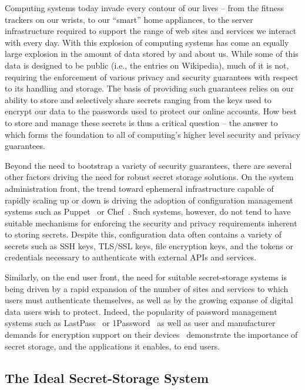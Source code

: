 Computing systems today invade every contour of our lives -- from the
fitness trackers on our wrists, to our ``smart'' home appliances, to
the server infrastructure required to support the range of web sites
and services we interact with every day. With this explosion of
computing systems has come an equally large explosion in the amount of
data stored by and about us. While some of this data is designed to be
public (i.e., the entries on Wikipedia), much of it is not, requiring
the enforcement of various privacy and security guarantees with
respect to its handling and storage. The basis of providing such
guarantees relies on our ability to store and selectively share
secrets ranging from the keys used to encrypt our data to the
passwords used to protect our online accounts. How best to store and
manage these secrets is thus a critical question -- the answer to
which forms the foundation to all of computing's higher level security
and privacy guarantees.

Beyond the need to bootstrap a variety of security guarantees, there
are several other factors driving the need for robust secret storage
solutions. On the system administration front, the trend toward
ephemeral infrastructure capable of rapidly scaling up or down is
driving the adoption of configuration management systems such as
Puppet~\cite{puppet} or Chef~\cite{chef}. Such systems, however, do
not tend to have suitable mechanisms for enforcing the security and
privacy requirements inherent to storing secrets. Despite this,
configuration data often contains a variety of secrets such as SSH
keys, TLS/SSL keys, file encryption keys, and the tokens or
credentials necessary to authenticate with external APIs and services.

Similarly, on the end user front, the need for suitable secret-storage
systems is being driven by a rapid expansion of the number of sites
and services to which users must authenticate themselves, as well as
by the growing expanse of digital data users wish to protect. Indeed,
the popularity of password management systems such as
LastPass~\cite{lastpass} or 1Password~\cite{onepassword} as well as
user and manufacturer demands for encryption support on their
devices~\cite{apple-fbiletter} demonstrate the importance of secret
storage, and the applications it enables, to end users.

\subsection{The Ideal Secret-Storage System}

